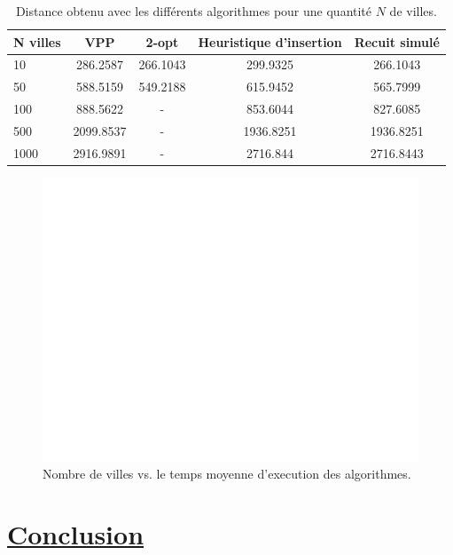 \documentclass[a4paper,11pt,fleqn]{article}
\begin{document}
\begin{table}[H]
    \centering
    \caption{Distance obtenu avec les différents algorithmes pour une quantité $N$ de villes.}
    \label{tab:distances}
    \begin{tabular}{lcccc}
        \hline
        N villes & VPP & 2-opt & Heuristique d'insertion & Recuit simulé \\ \hline\hline
        10  & 286.2587  & 266.1043  & 299.9325 & 266.1043 \\
        50  & 588.5159  & 549.2188  & 615.9452 & 565.7999 \\
        100 & 888.5622 & - & 853.6044 & 827.6085 \\
        500 & 2099.8537 & - & 1936.8251 & 1936.8251 \\
        1000 & 2916.9891 & - & 2716.844 & 2716.8443  \\ \hline
    \end{tabular}
\end{table}

\begin{figure}[H]
    \centering
    \includegraphics[width=\textwidth]{images/complexite_temporelle.pdf}
    \caption{Nombre de villes vs. le temps moyenne d'execution des algorithmes.}
    \label{fig:temps}
\end{figure}

\newpage

\section*{\underline{Conclusion}}

\newpage


\end{document}

